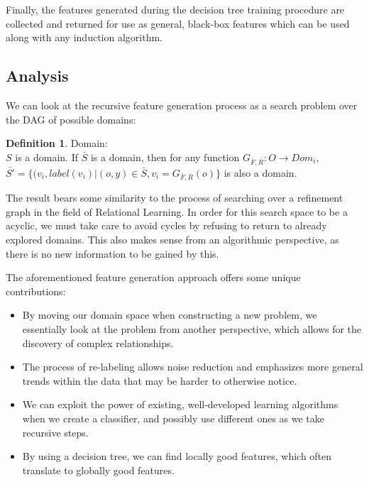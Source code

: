 \documentclass{article}
\theoremstyle{definition}
\newtheorem{defn}{Definition}[section]
\begin{document}
Finally, the features generated during the decision tree training procedure are collected and returned for use as general, black-box features which can be used along with any induction algorithm.

\subsection{Analysis}


We can look at the recursive feature generation process as a search problem over the DAG of possible domains:
\begin{defn} Domain:\\%
	$S$ is a domain.
	If $\bar{S}$ is a domain, then for any function $G_{\bar{F},\bar{R}}: O\rightarrow Dom_i$, $\bar{S'}=\{(v_i,label(v_i)|(o,y)\in \bar{S}, v_i=G_{\bar{F},\bar{R}}(o)\}$ is also a domain.
\end{defn}
The result bears some similarity to the process of searching over a refinement graph in the field of Relational Learning.
In order for this search space to be a acyclic, we must take care to avoid cycles by refusing to return to already explored domains. This also makes sense from an algorithmic perspective, as there is no new information to be gained by this.

The aforementioned feature generation approach offers some unique contributions:
\begin{itemize}
	\item By moving our domain space when constructing a new problem, we essentially look at the problem from another perspective, which allows for the discovery of complex relationships.
	\item The process of re-labeling allows noise reduction and emphasizes more general trends within the data that may be harder to otherwise notice.
	\item We can exploit the power of existing, well-developed learning algorithms when we create a classifier, and possibly use different ones as we take recursive steps.
	\item By using a decision tree, we can find locally good features, which often translate to globally good features.
\end{itemize}
\end{document}
